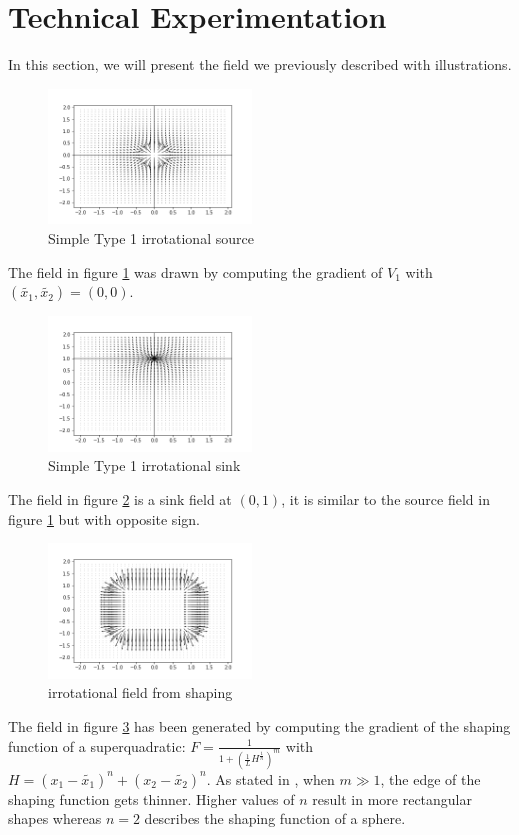 \section{Technical Experimentation}
In this section, we will present the field we previously described with illustrations. 
\begin{figure}[h!]
    \centering
    \includegraphics[width=0.48\textwidth]{Images/simplesource.png}
    \caption{Simple Type 1 irrotational source}
    \label{fig:simplesource}
\end{figure}
The field in figure \ref{fig:simplesource} was drawn by computing the gradient of $V_1$ with $(\tilde{{x}_{1}}, \tilde{{x}_{2}}) = (0,0)$.

\begin{figure}[h!]
    \centering
    \includegraphics[width=0.48\textwidth]{Images/simplesink01.png}
    \caption{Simple Type 1 irrotational sink}
    \label{fig:simplesink}
\end{figure}
The field in figure \ref{fig:simplesink} is a sink field at $(0,1)$, it is similar to the source field in figure \ref{fig:simplesource} but with opposite sign.

\begin{figure}[h!]
    \centering
    \includegraphics[width=0.48\textwidth]{Images/irrotafromshaping.png}
    \caption{irrotational field from shaping}
    \label{fig:irrotafromshaping}
\end{figure}
The field in figure \ref{fig:irrotafromshaping} has been generated by computing the gradient of the shaping function of a superquadratic: 
$F=\frac{1}{1+(\frac{1}{L}H^{\frac{1}{n}})^m}$ with $H=(x_1-\tilde{{x}_{1}})^n+(x_2-\tilde{{x}_{2}})^n$.
As stated in \cite{mcinnes2003velocity}, when $m\gg1$, the edge of the shaping function gets thinner. Higher values of $n$ result in more rectangular shapes whereas $n=2$ describes the shaping function of a sphere.


